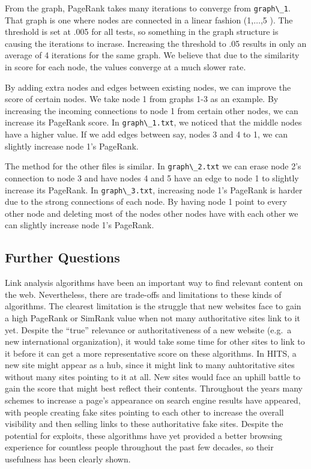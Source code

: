 \documentclass[
  paper=a4,
,captions=tableheading
]{scrartcl}
\newcommand{\passthrough}[1]{#1}
\begin{document}
From the graph, PageRank takes many iterations to converge from
\passthrough{\lstinline!graph\_1!}. That graph is one where nodes are
connected in a linear fashion (1,\(\dots\),5
). The threshold is set at .005 for all tests, so something
in the graph structure is causing the iterations to incrase. Increasing
the threshold to .05 results in only an average of 4 iterations for the
same graph. We believe that due to the similarity in score for each
node, the values converge at a much slower rate.

By adding extra nodes and edges between existing nodes, we can improve
the score of certain nodes. We take node 1 from graphs 1-3 as an
example. By increasing the incoming connections to node 1 from certain
other nodes, we can increase its PageRank score. In
\passthrough{\lstinline!graph\_1.txt!}, we noticed that the middle nodes
have a higher value. If we add edges between say, nodes 3 and 4 to 1, we
can slightly increase node 1's PageRank.

The method for the other files is similar. In
\passthrough{\lstinline!graph\_2.txt!} we can erase node 2's connection
to node 3 and have nodes 4 and 5 have an edge to node 1 to slightly
increase its PageRank. In \passthrough{\lstinline!graph\_3.txt!},
increasing node 1's PageRank is harder due to the strong connections of
each node. By having node 1 point to every other node and deleting most
of the nodes other nodes have with each other we can slightly increase
node 1's PageRank.

\hypertarget{further-questions}{%
\subsection{Further Questions}\label{further-questions}}

Link analysis algorithms have been an important way to find relevant
content on the web. Nevertheless, there are trade-offs and limitations
to these kinds of algorithms. The clearest limitation is the struggle
that new websites face to gain a high PageRank or SimRank value when not
many authoritative sites link to it yet. Despite the ``true'' relevance
or authoritativeness of a new website (e.g.~a new international
organization), it would take some time for other sites to link to it
before it can get a more representative score on these algorithms. In
HITS, a new site might appear as a hub, since it might link to many
auhtoritative sites without many sites pointing to it at all. New sites
would face an uphill battle to gain the score that might best reflect
their contents. Throughout the years many schemes to increase a page's
appearance on search engine results have appeared, with people creating
fake sites pointing to each other to increase the overall visibility and
then selling links to these authoritative fake sites. Despite the
potential for exploits, these algorithms have yet provided a better
browsing experience for countless people throughout the past few
decades, so their usefulness has been clearly shown.
\end{document}
